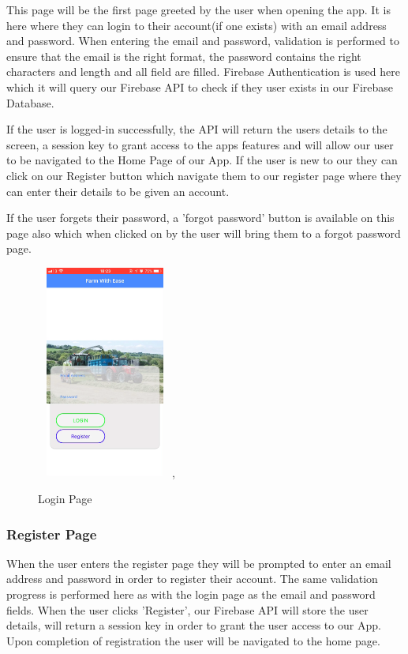 \documentclass[12pt,a4paper,oneside,openany]{book}
\begin{document}
This page will be the first page greeted by the user when opening the app. It is here where they can login to their account(if one exists) with an email address and password. When entering the email and password, validation is performed to ensure that the email is the right format, the password contains the right characters and length and all ﬁeld are ﬁlled. Firebase Authentication is used here which it will query our Firebase API to check if they user exists in our Firebase Database.

If the user is logged-in successfully, the API will return the users details to the screen, a session key to grant access to the apps features and will allow our user to be navigated to the Home Page of our App. If the user is new to our they can click on our Register button which navigate them to our register page where they can enter their details to be given an account.

If the user forgets their password, a 'forgot password' button is available on this page also which when clicked on by the user will bring them to a forgot password page. 

\begin{figure}[ht]
\renewcommand\thefigure{5.9}
\centering
\includegraphics[width=4.5cm,height=7cm]{Images/loginPage.jpg},
\caption{Login Page}
\label{login}
\end{figure}

\subsubsection{Register Page}
When the user enters the register page they will be prompted to enter an email address and password in order to register their account. The same validation progress is performed here as with the login page as the email and password fields. When the user clicks 'Register', our Firebase API will store the user details, will return a session key in order to grant the user access to our App. Upon completion of registration the user will be navigated to the home page.
\end{document}

